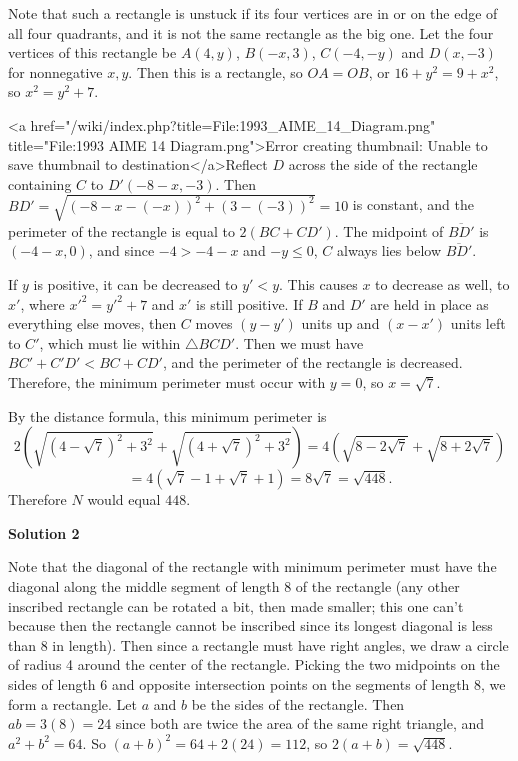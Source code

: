 \begin{enumerate}
 Note that such a rectangle is unstuck if its four vertices are in or on the edge of all four quadrants, and it is not the same rectangle as the big one. Let the four vertices of this rectangle be $A(4,y)$, $B(-x,3)$, $C(-4,-y)$ and $D(x,-3)$ for nonnegative $x,y$. Then this is a rectangle, so $OA=OB$, or $16+y^2=9+x^2$, so $x^2=y^2+7$.

 <a href="/wiki/index.php?title=File:1993\_AIME\_14\_Diagram.png" title="File:1993 AIME 14 Diagram.png">Error creating thumbnail: Unable to save thumbnail to destination</a>Reflect $D$ across the side of the rectangle containing $C$ to $D'(-8-x,-3)$. Then $BD'=\sqrt{(-8-x-(-x))^2+(3-(-3))^2}=10$ is constant, and the perimeter of the rectangle is equal to $2(BC+CD')$. The midpoint of $\overline{BD'}$ is $(-4-x,0)$, and since $-4>-4-x$ and $-y\le0$, $C$ always lies below $\overline{BD'}$.

 If $y$ is positive, it can be decreased to $y'<y$. This causes $x$ to decrease as well, to $x'$, where $x'^2=y'^2+7$ and $x'$ is still positive. If $B$ and $D'$ are held in place as everything else moves, then $C$ moves $(y-y')$ units up and $(x-x')$ units left to $C'$, which must lie within $\triangle BCD'$. Then we must have $BC'+C'D'<BC+CD'$, and the perimeter of the rectangle is decreased. Therefore, the minimum perimeter must occur with $y=0$, so $x=\sqrt7$.

 By the distance formula, this minimum perimeter is 
 \[2\left(\sqrt{(4-\sqrt7)^2+3^2}+\sqrt{(4+\sqrt7)^2+3^2}\right)=4\left(\sqrt{8-2\sqrt7}+\sqrt{8+2\sqrt7}\right)\] 
 \[=4(\sqrt7-1+\sqrt7+1)=8\sqrt7=\sqrt{448}.\] Therefore $N$ would equal $\boxed{448}.$




\textbf{Solution 2}

Note that the diagonal of the rectangle with minimum perimeter must have the diagonal along the middle segment of length 8 of the rectangle (any other inscribed rectangle can be rotated a bit, then made smaller; this one can't because then the rectangle cannot be inscribed since its longest diagonal is less than 8 in length). Then since a rectangle must have right angles, we draw a circle of radius 4 around the center of the rectangle. Picking the two midpoints on the sides of length 6 and opposite intersection points on the segments of length 8, we form a rectangle. Let $a$ and $b$ be the sides of the rectangle. Then $ab = 3(8) = 24$ since both are twice the area of the same right triangle, and $a^2+b^2 = 64$. So $(a+b)^2 = 64+2(24) = 112$, so $2(a+b) = \sqrt{\boxed{448}}$.


\end{enumerate}
